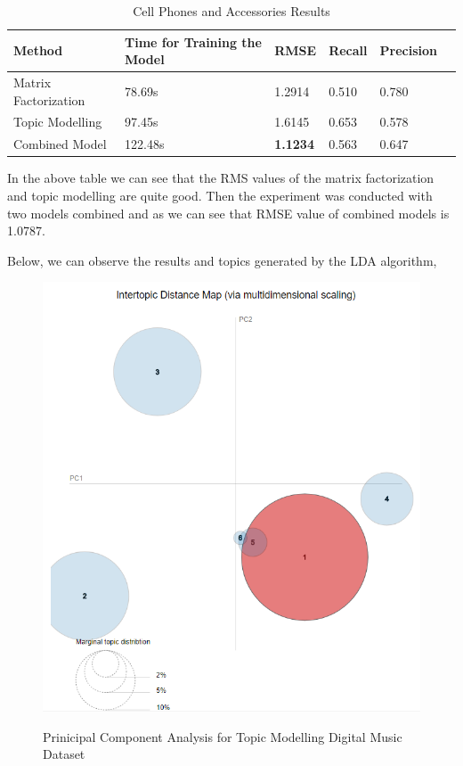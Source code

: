 \begin{table}[h]
\centering
\begin{tabular}{ llllll }
\toprule
\textbf{Method} & \textbf{Time for Training the Model} & \textbf{RMSE} & \textbf{Recall} & \textbf{Precision}  \\
\midrule
Matrix Factorization & 78.69s & 1.2914 & 0.510 & 0.780  \\
\hline
Topic Modelling & 97.45s & 1.6145 & 0.653 & 0.578 \\
\hline
Combined Model & 122.48s  & \textbf{1.1234} & 0.563 & 0.647 \\ 
\bottomrule        
\end{tabular}
\caption{Cell Phones and Accessories Results}\label{Cell Phones and Accessories Results}
\end{table}


In the above table we can see that the RMS values of the matrix factorization and topic modelling are quite good.
Then the experiment was conducted with two models combined and as we can see that RMSE value of combined models is 1.0787.

Below, we can observe the results and topics generated by the LDA algorithm,

\begin{figure}[H]
  {\includegraphics[width = 0.85 \textwidth]{img/lda/1.PNG}}
  \caption{Prinicipal Component Analysis for Topic Modelling Digital Music Dataset}
\end{figure}

